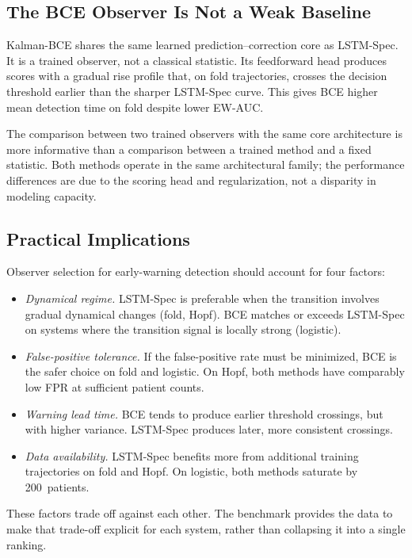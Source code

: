 \subsection{The BCE Observer Is Not a Weak Baseline}
\label{sec:discussion:baselines}

Kalman-BCE shares the same learned prediction--correction core as LSTM-Spec. It
is a trained observer, not a classical statistic. Its feedforward head produces
scores with a gradual rise profile that, on fold trajectories, crosses the
decision threshold earlier than the sharper LSTM-Spec curve. This gives BCE
higher mean detection time on fold despite lower EW-AUC.

The comparison between two trained observers with the same core architecture is
more informative than a comparison between a trained method and a fixed
statistic. Both methods operate in the same architectural family; the
performance differences are due to the scoring head and regularization, not a
disparity in modeling capacity.

\subsection{Practical Implications}
\label{sec:discussion:implications}

Observer selection for early-warning detection should account for four factors:

\begin{itemize}[leftmargin=*]
  \item \emph{Dynamical regime.} LSTM-Spec is preferable when the transition
        involves gradual dynamical changes (fold, Hopf). BCE matches or exceeds
        LSTM-Spec on systems where the transition signal is locally strong
        (logistic).
  \item \emph{False-positive tolerance.} If the false-positive rate must be
        minimized, BCE is the safer choice on fold and logistic. On Hopf, both
        methods have comparably low FPR at sufficient patient counts.
  \item \emph{Warning lead time.} BCE tends to produce earlier threshold
        crossings, but with higher variance. LSTM-Spec produces later, more
        consistent crossings.
  \item \emph{Data availability.} LSTM-Spec benefits more from additional
        training trajectories on fold and Hopf. On logistic, both methods
        saturate by 200~patients.
\end{itemize}

These factors trade off against each other. The benchmark provides the data to
make that trade-off explicit for each system, rather than collapsing it into a
single ranking.
